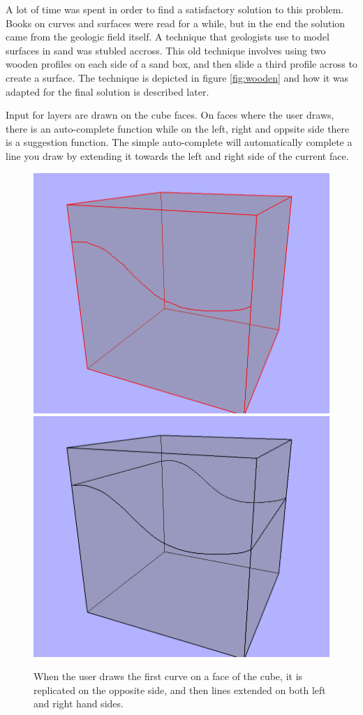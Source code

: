 \documentclass[a4paper,12pt]{report}
\begin{document}
A lot of time was spent in order to find a satisfactory solution to this problem. Books on curves and surfaces were read for a while, but in the end the solution came from the geologic field itself. A technique that geologists use to model surfaces in sand was stubled accross. This old technique involves using two wooden profiles on each side of a sand box, and then slide a third profile across to create a surface. The technique is depicted in figure \ref{fig:wooden} and how it was adapted for the final solution is described later. 


Input for layers are drawn on the cube faces. On faces where the user draws, there is an auto-complete function while on the left, right and oppsite side there is a suggestion function. The simple auto-complete will automatically complete a line you draw by extending it towards the left and right side of the current face. 

\begin{figure}
\includegraphics[width=.5\linewidth]{thesis/suggestion1.png}
\includegraphics[width=.5\linewidth]{thesis/suggestion2.png}
 \caption{When the user draws the first curve on a face of the cube, it is replicated on the opposite side, and then lines extended on both left and right hand sides.}
 \label{fig:suggest}
\end{figure}
\end{document}
